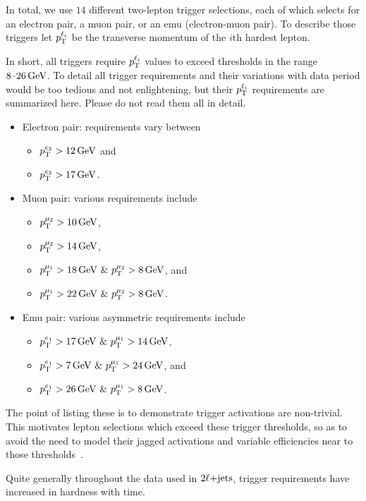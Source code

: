 In total, we use $14$ different two-lepton trigger selections, each of which
selects for an electron pair, a muon pair, or an emu (electron-muon pair).
To describe those triggers let $\pt^{\ell_i}$ be the transverse momentum of the
$i\mathrm{th}$ hardest lepton.

In short, all triggers require $\pt^{\ell_i}$ values to exceed thresholds in
the range $8\textrm{--}26\,\eV[G]$.
To detail all trigger requirements and their variations with data period
would be too tedious and not enlightening, but their $\pt^{\ell_i}$ requirements
are summarized here.
Please do not read them all in detail.
\begin{itemize}
\item Electron pair: requirements vary between
\begin{itemize}
\item $\pt^{e_2} > 12\,\eV[G]$ and
\item $\pt^{e_2} > 17\,\eV[G]$.
\end{itemize}
\item Muon pair: various requirements include
\begin{itemize}
\item $\pt^{\mu_2} > 10\,\eV[G]$,
\item $\pt^{\mu_2} > 14\,\eV[G]$,
\item $\pt^{\mu_1} > 18\,\eV[G]~\&~\pt^{\mu_2} > 8\,\eV[G]$, and
\item $\pt^{\mu_1} > 22\,\eV[G]~\&~\pt^{\mu_2} > 8\,\eV[G]$.
\end{itemize}
\item Emu pair: various asymmetric requirements include
\begin{itemize}
\item $\pt^{e_1} > 17\,\eV[G]~\&~\pt^{\mu_1} > 14\,\eV[G]$,
\item $\pt^{e_1} > 7\,\eV[G]~\&~\pt^{\mu_1} > 24\,\eV[G]$, and
\item $\pt^{e_1} > 26\,\eV[G]~\&~\pt^{\mu_1} > 8\,\eV[G]$.
\end{itemize}
\end{itemize}
The point of listing these is to demonstrate trigger activations are
non-trivial.
This motivates lepton selections which exceed these trigger thresholds,
so as to avoid the need to model their jagged activations and variable
efficiencies near to those thresholds~\cite{
atlas_trigger_egamma_run2,
atlas_trigger_muon_run2
}.

Quite generally throughout the data used in $\twoljets$, trigger requirements
have increased in hardness with time.


